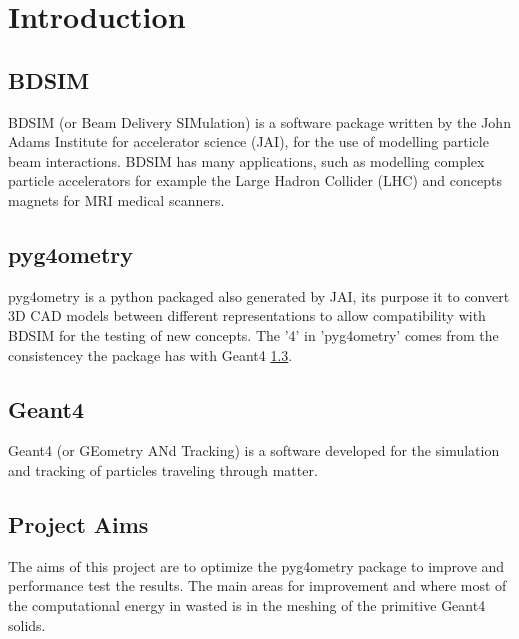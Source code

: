 \documentclass[12pt,a4paper]{article}
\begin{document}
\begin{titlepage}
\end{titlepage}
\leavevmode\thispagestyle{empty}\newpage
\tableofcontents
\thispagestyle{empty}
\newpage
\onecolumn

\small
\setcounter{page}{1}
\section{Introduction}

\subsection{BDSIM}
BDSIM (or Beam Delivery SIMulation) is a software package written by the John Adams Institute for accelerator science (JAI), for the use of modelling particle beam interactions. BDSIM has many applications, such as modelling complex particle accelerators for example the Large Hadron Collider (LHC) and concepts magnets for MRI medical scanners.  

\subsection{pyg4ometry}
pyg4ometry is a python packaged also generated by JAI, its purpose it to convert 3D CAD models between different representations to allow compatibility with BDSIM for the testing of new concepts. The '4' in 'pyg4ometry' comes from the consistencey the package has with Geant4 \ref{geant4}.

\subsection{Geant4}\label{geant4}
Geant4 (or GEometry ANd Tracking) is a software developed for the simulation and tracking of particles traveling through matter.

\subsection{Project Aims}
The aims of this project are to optimize the pyg4ometry package to improve and performance test the results. The main areas for improvement and where most of the computational energy in wasted is in the meshing of the primitive Geant4 solids.
\end{document}
